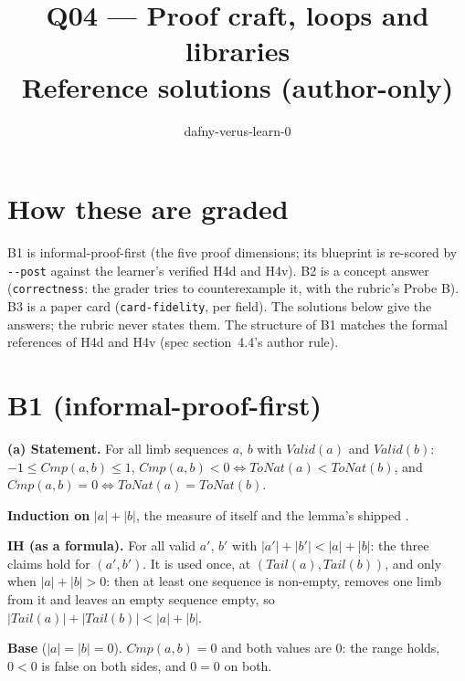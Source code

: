 \documentclass[11pt]{article}
\title{Q04 --- Proof craft, loops and libraries \\ \large Reference solutions (author-only)}
\author{dafny-verus-learn-0}
\date{}
\begin{document}
\maketitle

\section*{How these are graded}
B1 is informal-proof-first (the five proof dimensions; its blueprint is
re-scored by \verb+--post+ against the learner's verified H4d and H4v). B2 is a
concept answer (\texttt{correctness}: the grader tries to counterexample it,
with the rubric's Probe B). B3 is a paper card (\texttt{card-fidelity}, per
field). The solutions below give the answers; the rubric never states them.
The structure of B1 matches the formal references of H4d and H4v (spec
section~4.4's author rule).

\section*{B1 (informal-proof-first)}

\textbf{(a) Statement.} For all limb sequences $a$, $b$ with
$\mathit{Valid}(a)$ and $\mathit{Valid}(b)$: $-1 \leq \mathit{Cmp}(a, b) \leq 1$,
$\mathit{Cmp}(a, b) < 0 \iff \mathit{ToNat}(a) < \mathit{ToNat}(b)$, and
$\mathit{Cmp}(a, b) = 0 \iff \mathit{ToNat}(a) = \mathit{ToNat}(b)$.

\textbf{Induction on} $|a| + |b|$, the measure of  itself and the
lemma's shipped .

\textbf{IH (as a formula).} For all valid $a'$, $b'$ with
$|a'| + |b'| < |a| + |b|$: the three claims hold for $(a', b')$. It is used
once, at $(\mathit{Tail}(a), \mathit{Tail}(b))$, and only when
$|a| + |b| > 0$: then at least one sequence is non-empty,  removes
one limb from it and leaves an empty sequence empty, so
$|\mathit{Tail}(a)| + |\mathit{Tail}(b)| < |a| + |b|$.

\textbf{Base} ($|a| = |b| = 0$). $\mathit{Cmp}(a, b) = 0$ and both values are
$0$: the range holds, $0 < 0$ is false on both sides, and $0 = 0$ on both.
\end{document}
